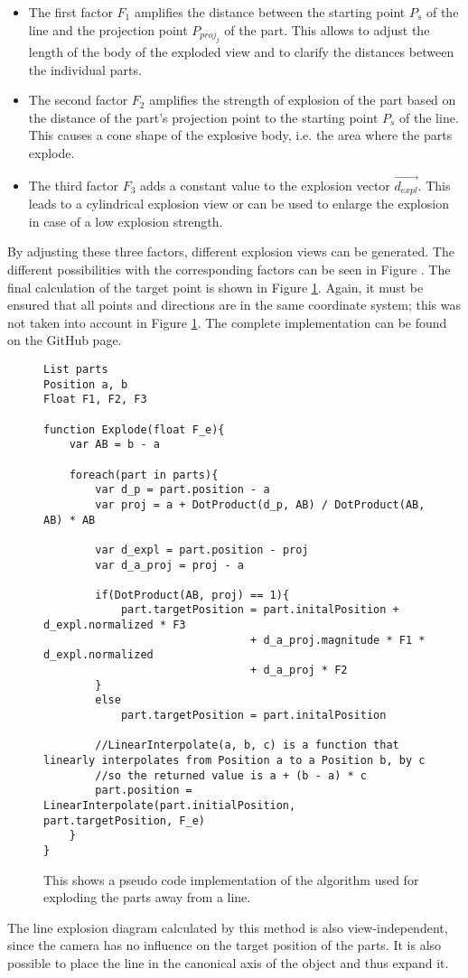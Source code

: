 \begin{itemize}
	\item The first factor $F_1$ amplifies the distance between the starting point $P_s$ of the line and the projection point $P_{proj_j}$ of the part. %
	This allows to adjust the length of the body of the exploded view and to clarify the distances between the individual parts.  
	\item The second factor $F_2$ amplifies the strength of explosion of the part based on the distance of the part's projection point to the starting point $P_s$ of the line. 
	This causes a cone shape of the explosive body, i.e. the area where the parts explode.
	\item The third factor $F_3$ adds a constant value to the explosion vector $\vec{d_{expl}}$. 
	This leads to a cylindrical explosion view or can be used to enlarge the explosion in case of a low explosion strength.  
\end{itemize}
By adjusting these three factors, different explosion views can be generated. The different possibilities with the corresponding factors can be seen in Figure .  %
The final calculation of the target point is shown in Figure \ref{fig:LineexplosionCode}.
Again, it must be ensured that all points and directions are in the same coordinate system; this was not taken into account in Figure \ref{fig:LineexplosionCode}. The complete implementation can be found on the GitHub page. %
\begin{figure}[hb]
	\begin{lstlisting}
List parts
Position a, b
Float F1, F2, F3

function Explode(float F_e){
	var AB = b - a
	
	foreach(part in parts){
		var d_p = part.position - a
		var proj = a + DotProduct(d_p, AB) / DotProduct(AB, AB) * AB
		
		var d_expl = part.position - proj
		var d_a_proj = proj - a
		
		if(DotProduct(AB, proj) == 1){
			part.targetPosition = part.initalPosition + d_expl.normalized * F3
								+ d_a_proj.magnitude * F1 * d_expl.normalized
								+ d_a_proj * F2
		}
		else
			part.targetPosition = part.initalPosition
		
		//LinearInterpolate(a, b, c) is a function that linearly interpolates from Position a to a Position b, by c
		//so the returned value is a + (b - a) * c
		part.position = LinearInterpolate(part.initialPosition, part.targetPosition, F_e)
	}
}
	\end{lstlisting}
	\caption{This shows a pseudo code implementation of the algorithm used for exploding the parts away from a line.}
	\label{fig:LineexplosionCode}
\end{figure}
The line explosion diagram calculated by this method is also view-independent, since the camera has no influence on the target position of the parts.  
It is also possible to place the line in the canonical axis of the object and thus expand it.  

